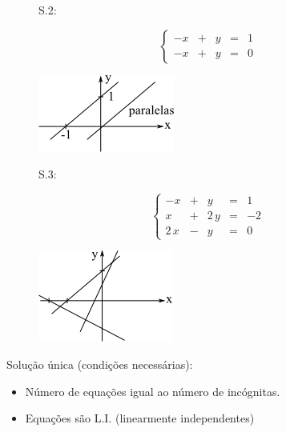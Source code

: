 \begin{description}
\begin{figure}[!ht]
 \centering
 \begin{minipage}[c]{0.8cm}
 S.2:
 \end{minipage}
 \begin{minipage}[c]{3cm}
    \[
     \left\{ \begin{array}{rrrrr}
      -x & + & y & = & 1 \\
      -x & + & y & = & 0
     \end{array} \right.
    \]
 \end{minipage}\hspace*{2cm}
 \begin{minipage}[c]{5cm}
    \includegraphics[scale=0.8]{capitulos/capitulo4/figuras/prob_nao_resol2.png}
    \label{fig:prob_nao_resol2}
 \end{minipage}
\end{figure}

\begin{figure}[!ht]
 \centering
 \begin{minipage}[c]{0.8cm}
 S.3:
 \end{minipage}
 \begin{minipage}[c]{3cm}
    \[
     \left\{ \begin{array}{rrrrr}
      -x & + & y & = & 1 \\
      x & + & 2\,y & = & -2 \\
      2\,x & - & y & = & 0
     \end{array} \right.
    \]
 \end{minipage}\hspace*{2cm}
 \begin{minipage}[c]{5cm}
    \includegraphics[scale=0.8]{capitulos/capitulo4/figuras/prob_nao_resol3.png}
    \label{fig:prob_nao_resol3}
 \end{minipage}
\end{figure}

\item[] Solução única (condições necessárias):

\begin{itemize}

\item Número de equações igual ao número de incógnitas.

\item Equações são L.I. (linearmente independentes)

\end{itemize}

\end{description}